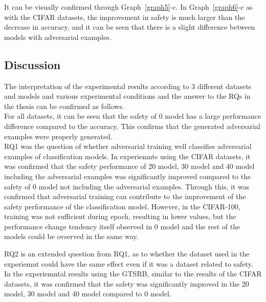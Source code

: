 \documentclass[journal,article,submit,moreauthors,pdftex]{Definitions/mdpi}
\begin{document}
It can be visually confirmed through Graph~\ref{graph5}-c.
In Graph~\ref{graph6}-c as with the CIFAR datasets, the improvement in safety is much larger than the decrease in accuracy, and it can be seen that there is a slight difference between models with adversarial examples.

\subsection{Discussion}


The interpretation of the experimental results according to 3 different datasets and models and various experimental conditions and the answer to the RQs in the thesis can be confirmed as follows. \\

For all datasets, it can be seen that the safety of 0 model has a large performance difference compared to the accuracy. This confirms that the generated adversarial examples were properly generated. \\

RQ1 was the question of whether adversarial training well classifies adversarial examples of classification models.
In experiemnts using the CIFAR datasets, it was confirmed that the safety performance of 20 model, 30 model and 40 model including the adversarial examples was significantly improved compared to the safety of 0 model not including the adversarial examples.
Through this, it was confirmed that adversarial training can contribute to the improvement of the safety performance of the classification model.
However, in the CIFAR-100, training was not sufficient during epoch, resulting in lower values, but the performance change tendency itself observed in 0 model and the rest of the models could be ovserved in the same way.

RQ2 is an extended question from RQ1, as to whether the dataset used in the experiemnt could have the same effect even if it was a dataset related to safety.
In the experiemntal results using the GTSRB, similar to the results of the CIFAR datasets, it was confirmed that the safety was significantly improved in the 20 model, 30 model and 40 model compared to 0 model.
\end{document}

